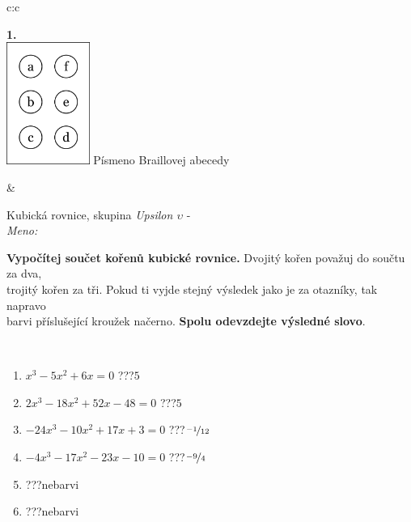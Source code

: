 \documentclass[10pt]{report}
\begin{document}
\begin{tabular}{c:c}
\begin{minipage}[c][104.5mm][t]{0.5\linewidth}
\begin{center}
\begin{minipage}{0.20\linewidth}
\begin{center}
{\Huge\bfseries 1.} \\[2mm]
\includegraphics[height=40mm]{../images/braille.png}
{\small Písmeno Braillovej abecedy}
\end{center}
\end{minipage}
\end{center}
\end{minipage}
&
\begin{minipage}[c][104.5mm][t]{0.5\linewidth}
\begin{center}
\vspace{7mm}
{\huge Kubická rovnice, skupina \textit{Upsilon $\upsilon$} -}\\[5mm]
\textit{Meno:}\phantom{xxxxxxxxxxxxxxxxxxxxxxxxxxxxxxxxxxxxxxxxxxxxxxxxxxxxxxxxxxxxxxxxx}\\[5mm]
\begin{minipage}{0.95\linewidth}
\textbf{Vypočítej součet kořenů kubické rovnice.} Dvojitý kořen považuj do součtu za dva,\\trojitý kořen za tři. Pokud ti vyjde stejný výsledek jako je za otazníky, tak napravo\\barvi příslušející kroužek načerno. \textbf{Spolu odevzdejte výsledné slovo}.
\end{minipage}
\\[1mm]
\begin{minipage}{0.79\linewidth}
\begin{center}
\begin{varwidth}{\linewidth}
\begin{enumerate}
\Large
\item $x^3-5x^2+6x=0$\quad \dotfill\; ???\;\dotfill \quad $5$
\item $2x^3-18x^2+52x-48=0$\quad \dotfill\; ???\;\dotfill \quad $5$
\item $-24x^3-10x^2+17x+3=0$\quad \dotfill\; ???\;\dotfill \quad $\nicefrac{-1}{12}$
\item $-4x^3-17x^2-23x-10=0$\quad \dotfill\; ???\;\dotfill \quad $\nicefrac{-9}{4}$
\item \quad \dotfill\; ???\;\dotfill \quad nebarvi
\item \quad \dotfill\; ???\;\dotfill \quad nebarvi

\end{enumerate}
\end{varwidth}
\end{center}
\end{minipage}
\end{center}
\end{minipage}
\end{tabular}
\end{document}
